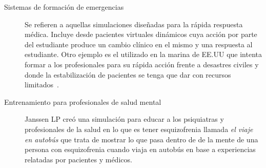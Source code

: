 \begin{description}
\item[Sistemas de formación de emergencias] Se refieren a aquellas simulaciones
	diseñadas para la rápida respuesta médica. Incluye desde pacientes
	virtuales dinámicos cuya acción por parte del estudiante produce un
	cambio clínico en el mismo y una respuesta al estudiante.  Otro ejemplo
	es el utilizado en la marina de EE.UU que intenta formar a los
	profesionales para su rápida acción frente a desastres civiles y donde
	la estabilización de pacientes se tenga que dar con recursos
	limitados~\cite{mantovani:vr}. 

\item[Entrenamiento para profesionales de salud mental] Janssen LP creó una
	simulación para educar a los psiquiatras y profesionales de la salud en
	lo que es tener esquizofrenia llamada \emph{el viaje en autobús} que
	trata de mostrar lo que pasa dentro de de la mente de una persona con
	esquizofrenia cuando viaja en autobús en base a experiencias relatadas
	por pacientes y médicos\cite{mantovani:vr}. 

\end{description}


